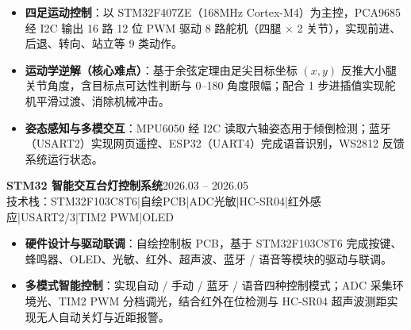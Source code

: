 \documentclass[10pt,a4paper]{article}
\newcommand{\projectblock}[3]{%
    {\bfseries\color{darktext}#1}\hfill{\color{graytext}#2}\\%
    {\small\color{graytext}#3}%
    \vspace{0.06em}%
}
\begin{document}
\begin{itemize}[leftmargin=1.5em, itemsep=1.5pt, parsep=0pt, topsep=1.5pt]
    \item \textbf{四足运动控制}：以 STM32F407ZE（168MHz Cortex-M4）为主控，PCA9685 经 I2C 输出 16 路 12 位 PWM 驱动 8 路舵机（四腿 $\times$ 2 关节），实现前进、后退、转向、站立等 9 类动作。
    \item \textbf{运动学逆解（核心难点）}：基于余弦定理由足尖目标坐标 $(x, y)$ 反推大小腿关节角度，含目标点可达性判断与 0\textdegree--180\textdegree{} 角度限幅；配合 1\textdegree{} 步进插值实现舵机平滑过渡、消除机械冲击。
    \item \textbf{姿态感知与多模交互}：MPU6050 经 I2C 读取六轴姿态用于倾倒检测；蓝牙（USART2）实现网页遥控、ESP32（UART4）完成语音识别，WS2812 反馈系统运行状态。
\end{itemize}

\vspace{0.06em}

\projectblock{STM32 智能交互台灯控制系统}{2026.03 -- 2026.05}{技术栈：STM32F103C8T6\hspace{0.3em}|\hspace{0.3em}自绘PCB\hspace{0.3em}|\hspace{0.3em}ADC光敏\hspace{0.3em}|\hspace{0.3em}HC-SR04\hspace{0.3em}|\hspace{0.3em}红外感应\hspace{0.3em}|\hspace{0.3em}USART2/3\hspace{0.3em}|\hspace{0.3em}TIM2 PWM\hspace{0.3em}|\hspace{0.3em}OLED}

\begin{itemize}[leftmargin=1.5em, itemsep=1.5pt, parsep=0pt, topsep=1.5pt]
    \item \textbf{硬件设计与驱动联调}：自绘控制板 PCB，基于 STM32F103C8T6 完成按键、蜂鸣器、OLED、光敏、红外、超声波、蓝牙 / 语音等模块的驱动与联调。
    \item \textbf{多模式智能控制}：实现自动 / 手动 / 蓝牙 / 语音四种控制模式；ADC 采集环境光、TIM2 PWM 分档调光，结合红外在位检测与 HC-SR04 超声波测距实现无人自动关灯与近距报警。
\end{itemize}

\vspace{0.06em}
\end{document}
